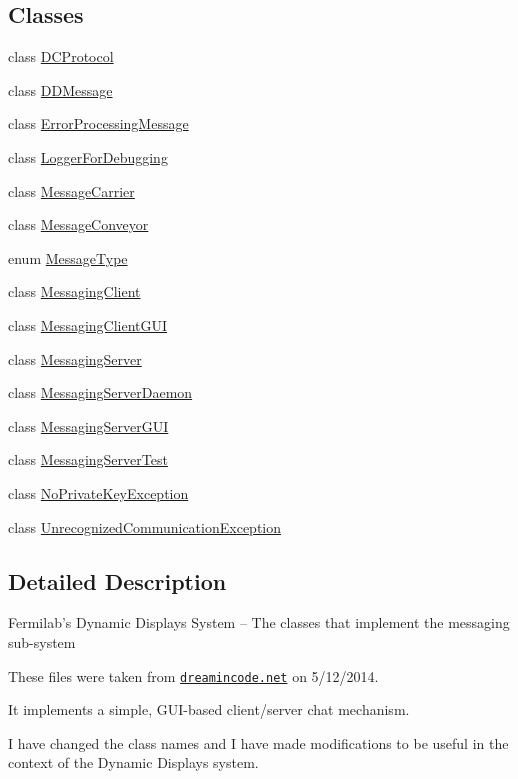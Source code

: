 \subsection*{Classes}
\begin{DoxyCompactItemize}
\item 
class \hyperlink{classgov_1_1fnal_1_1ppd_1_1dd_1_1chat_1_1DCProtocol}{D\-C\-Protocol}
\item 
class \hyperlink{classgov_1_1fnal_1_1ppd_1_1dd_1_1chat_1_1DDMessage}{D\-D\-Message}
\item 
class \hyperlink{classgov_1_1fnal_1_1ppd_1_1dd_1_1chat_1_1ErrorProcessingMessage}{Error\-Processing\-Message}
\item 
class \hyperlink{classgov_1_1fnal_1_1ppd_1_1dd_1_1chat_1_1LoggerForDebugging}{Logger\-For\-Debugging}
\item 
class \hyperlink{classgov_1_1fnal_1_1ppd_1_1dd_1_1chat_1_1MessageCarrier}{Message\-Carrier}
\item 
class \hyperlink{classgov_1_1fnal_1_1ppd_1_1dd_1_1chat_1_1MessageConveyor}{Message\-Conveyor}
\item 
enum \hyperlink{enumgov_1_1fnal_1_1ppd_1_1dd_1_1chat_1_1MessageType}{Message\-Type}
\item 
class \hyperlink{classgov_1_1fnal_1_1ppd_1_1dd_1_1chat_1_1MessagingClient}{Messaging\-Client}
\item 
class \hyperlink{classgov_1_1fnal_1_1ppd_1_1dd_1_1chat_1_1MessagingClientGUI}{Messaging\-Client\-G\-U\-I}
\item 
class \hyperlink{classgov_1_1fnal_1_1ppd_1_1dd_1_1chat_1_1MessagingServer}{Messaging\-Server}
\item 
class \hyperlink{classgov_1_1fnal_1_1ppd_1_1dd_1_1chat_1_1MessagingServerDaemon}{Messaging\-Server\-Daemon}
\item 
class \hyperlink{classgov_1_1fnal_1_1ppd_1_1dd_1_1chat_1_1MessagingServerGUI}{Messaging\-Server\-G\-U\-I}
\item 
class \hyperlink{classgov_1_1fnal_1_1ppd_1_1dd_1_1chat_1_1MessagingServerTest}{Messaging\-Server\-Test}
\item 
class \hyperlink{classgov_1_1fnal_1_1ppd_1_1dd_1_1chat_1_1NoPrivateKeyException}{No\-Private\-Key\-Exception}
\item 
class \hyperlink{classgov_1_1fnal_1_1ppd_1_1dd_1_1chat_1_1UnrecognizedCommunicationException}{Unrecognized\-Communication\-Exception}
\end{DoxyCompactItemize}


\subsection{Detailed Description}
Fermilab's Dynamic Displays System -- The classes that implement the messaging sub-\/system

These files were taken from \href{http://www.dreamincode.net/forums/topic/259777-a-simple-chat-program-with-clientserver-gui-optional/}{\tt dreamincode.\-net} on 5/12/2014.

It implements a simple, G\-U\-I-\/based client/server chat mechanism.

I have changed the class names and I have made modifications to be useful in the context of the Dynamic Displays system.